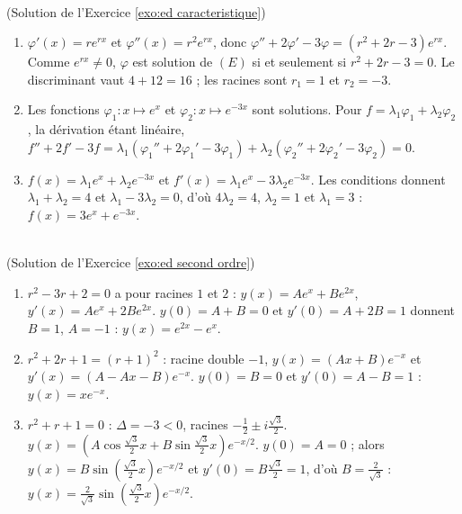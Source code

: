 \begin{corrige}
\begin{sol} ~ \\
(Solution de l'Exercice \ref{exo:ed caracteristique})
\begin{enumerate}
\item $\varphi'(x) = r e^{rx}$ et $\varphi''(x) = r^2 e^{rx}$, donc
      $\varphi'' + 2\varphi' - 3\varphi = (r^2 + 2r - 3) e^{rx}$. Comme $e^{rx} \neq 0$,
      $\varphi$ est solution de $(E)$ si et seulement si $r^2 + 2r - 3 = 0$.
      Le discriminant vaut $4 + 12 = 16$ ; les racines sont $r_1 = 1$ et $r_2 = -3$.
\item Les fonctions $\varphi_1 : x \mapsto e^{x}$ et $\varphi_2 : x \mapsto e^{-3x}$ sont solutions.
      Pour $f = \lambda_1 \varphi_1 + \lambda_2 \varphi_2$, la d\'erivation \'etant lin\'eaire,
      $f'' + 2f' - 3f = \lambda_1(\varphi_1'' + 2\varphi_1' - 3\varphi_1) + \lambda_2(\varphi_2'' + 2\varphi_2' - 3\varphi_2) = 0$.
\item $f(x) = \lambda_1 e^{x} + \lambda_2 e^{-3x}$ et $f'(x) = \lambda_1 e^{x} - 3\lambda_2 e^{-3x}$.
      Les conditions donnent $\lambda_1 + \lambda_2 = 4$ et $\lambda_1 - 3\lambda_2 = 0$, d'o\`u $4\lambda_2 = 4$,
      $\lambda_2 = 1$ et $\lambda_1 = 3$ : $\boxed{f(x) = 3 e^{x} + e^{-3x}}$.
\end{enumerate}
\end{sol}

\begin{sol} ~ \\
(Solution de l'Exercice \ref{exo:ed second ordre})
\begin{enumerate}
\item $r^2 - 3r + 2 = 0$ a pour racines $1$ et $2$ : $y(x) = A e^{x} + B e^{2x}$, $y'(x) = A e^{x} + 2B e^{2x}$.
      $y(0) = A + B = 0$ et $y'(0) = A + 2B = 1$ donnent $B = 1$, $A = -1$ : $\boxed{y(x) = e^{2x} - e^{x}}$.
\item $r^2 + 2r + 1 = (r+1)^2$ : racine double $-1$, $y(x) = (Ax + B) e^{-x}$ et
      $y'(x) = (A - Ax - B) e^{-x}$. $y(0) = B = 0$ et $y'(0) = A - B = 1$ : $\boxed{y(x) = x e^{-x}}$.
\item $r^2 + r + 1 = 0$ : $\Delta = -3 < 0$, racines $-\frac{1}{2} \pm i \frac{\sqrt{3}}{2}$.
      $y(x) = \left(A \cos \frac{\sqrt{3}}{2}x + B \sin \frac{\sqrt{3}}{2}x\right) e^{-x/2}$.
      $y(0) = A = 0$ ; alors $y(x) = B \sin\left(\frac{\sqrt{3}}{2}x\right) e^{-x/2}$ et
      $y'(0) = B\frac{\sqrt{3}}{2} = 1$, d'o\`u $B = \frac{2}{\sqrt{3}}$ :
      $\boxed{y(x) = \frac{2}{\sqrt{3}} \sin\left(\frac{\sqrt{3}}{2}x\right) e^{-x/2}}$.
\end{enumerate}
\end{sol}


\end{corrige}
